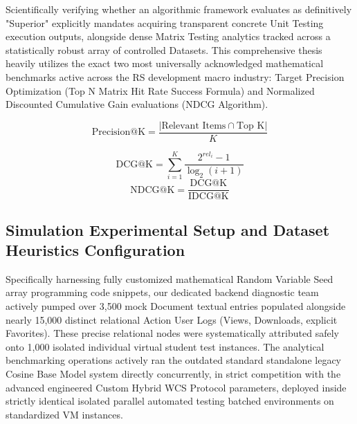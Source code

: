 \documentclass[journal]{IEEEtran}
\begin{document}
Scientifically verifying whether an algorithmic framework evaluates as definitively "Superior" explicitly mandates acquiring transparent concrete Unit Testing execution outputs, alongside dense Matrix Testing analytics tracked across a statistically robust array of controlled Datasets. 
This comprehensive thesis heavily utilizes the exact two most universally acknowledged mathematical benchmarks active across the RS development macro industry: Target Precision Optimization (Top N Matrix Hit Rate Success Formula) and Normalized Discounted Cumulative Gain evaluations (NDCG Algorithm).

\begin{equation}
\text{Precision@K} = \frac{|\text{Relevant Items} \cap \text{Top K}|}{K}
\end{equation}

\begin{equation}
\text{DCG@K} = \sum_{i=1}^{K} \frac{2^{rel_i} - 1}{\log_2(i + 1)} 
\end{equation}
\begin{equation}
\text{NDCG@K} = \frac{\text{DCG@K}}{\text{IDCG@K}}
\end{equation}

\subsection{Simulation Experimental Setup and Dataset Heuristics Configuration}

Specifically harnessing fully customized mathematical Random Variable Seed array programming code snippets, our dedicated backend diagnostic team actively pumped over 3,500 mock Document textual entries populated alongside nearly 15,000 distinct relational Action User Logs (Views, Downloads, explicit Favorites). 
These precise relational nodes were systematically attributed safely onto 1,000 isolated individual virtual student test instances. 
The analytical benchmarking operations actively ran the outdated standard standalone legacy Cosine Base Model system directly concurrently, in strict competition with the advanced engineered Custom Hybrid WCS Protocol parameters, deployed inside strictly identical isolated parallel automated testing batched environments on standardized VM instances.
\end{document}
